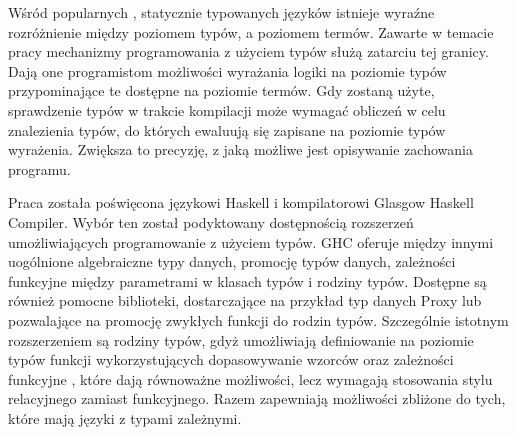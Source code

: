 Wśród popularnych
, statycznie typowanych języków istnieje wyraźne rozróżnienie
między poziomem typów, a poziomem termów.
Zawarte w temacie pracy mechanizmy
programowania z użyciem typów służą zatarciu tej granicy.
Dają one programistom
możliwości wyrażania logiki na poziomie typów przypominające  te dostępne na
poziomie termów. Gdy zostaną użyte, sprawdzenie typów w trakcie kompilacji może
wymagać obliczeń w celu znalezienia typów, do których ewaluują się zapisane na
poziomie typów wyrażenia.
Zwiększa to precyzję, z jaką możliwe jest opisywanie
zachowania programu.

Praca została poświęcona językowi Haskell i kompilatorowi Glasgow Haskell
Compiler. Wybór ten został podyktowany dostępnością rozszerzeń umożliwiających
programowanie z użyciem typów. GHC oferuje między innymi uogólnione algebraiczne
typy danych, promocję typów danych, zależności funkcyjne między parametrami w
klasach typów i rodziny typów.
Dostępne są również pomocne biblioteki,
dostarczające na przykład typ danych Proxy
lub pozwalające na promocję zwykłych
funkcji do rodzin typów. Szczególnie istotnym rozszerzeniem są rodziny typów,
gdyż umożliwiają definiowanie na poziomie typów funkcji wykorzystujących
dopasowywanie wzorców oraz zależności funkcyjne
, które dają równoważne możliwości, lecz wymagają stosowania stylu relacyjnego zamiast
funkcyjnego. Razem zapewniają możliwości zbliżone do tych, które mają języki z
typami zależnymi.

